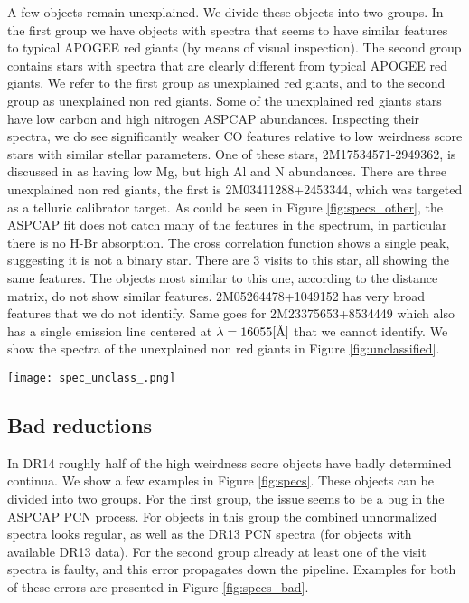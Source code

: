 \documentclass[fleqn,usenatbib]{mnras}
\newcommand{\angstrom}{\mbox{\normalfont\AA}}
\begin{document}
A few objects remain unexplained. We divide these objects into two groups. In the first group we have objects with spectra that seems to have similar features to typical APOGEE red giants (by means of visual inspection). The second group contains stars with spectra that are clearly different from typical APOGEE red giants. We refer to the first group as unexplained red giants, and to the second group as unexplained non red giants. Some of the unexplained red giants stars have low carbon and high nitrogen ASPCAP abundances. Inspecting their spectra, we do see significantly weaker CO features relative to low weirdness score stars with similar stellar parameters. One of these stars, 2M17534571-2949362, is discussed in \cite{fernandez-trincado17} as having low Mg, but high Al and N abundances. There are three unexplained non red giants, the first is 2M03411288+2453344, which was targeted as a telluric calibrator target. As could be seen in Figure \ref{fig:specs_other}, the ASPCAP fit does not catch many of the features in the spectrum, in particular there is no H-Br absorption. The cross correlation function shows a single peak, suggesting it is not a binary star. There are 3 visits to this star, all showing the same features. The objects most similar to this one, according to the distance matrix, do not show similar features. 2M05264478+1049152 has very broad features that we do not identify. Same goes for 2M23375653+8534449 which also has a single emission line centered at $\lambda = 16055 [\angstrom]$ that we cannot identify. We show the spectra of the unexplained non red giants in Figure \ref{fig:unclassified}.

\begin{figure*}
\texttt{[image: spec\_unclass\_.png]}
\caption{Spectra for the three unclassified outliers. Top spectrum is a typical APOGEE red giant, for comparison. The red line is the ASPCAP fit and the blue line is the PCN spectrum, except where indicated. $\mathrm{PR}\left(W_{250}\right)$ indicates the percentile of objects with lower weirdness score. Relative fluxes are offset by a constant for display purposes.}
\label{fig:unclassified}
\end{figure*}

\subsection{Bad reductions}
In DR14 roughly half of the high weirdness score objects have badly determined continua. We show a few examples in Figure \ref{fig:specs}. These objects can be divided into two groups. For the first group, the issue seems to be a bug in the ASPCAP PCN process. For objects in this group the combined unnormalized spectra looks regular, as well as the DR13 PCN spectra (for objects with available DR13 data). For the second group already at least one of the visit spectra is faulty, and this error propagates down the pipeline. Examples for both of these errors are presented in Figure \ref{fig:specs_bad}.
\end{document}
